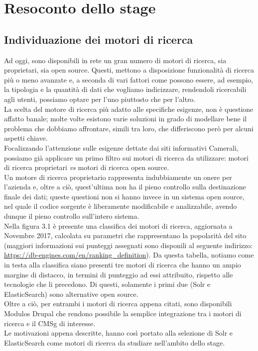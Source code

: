 

\chapter{Resoconto dello stage}
\label{cap:resoconto_dello_stage}

	\section{Individuazione dei motori di ricerca}
	Ad oggi, sono disponibili in rete un gran numero di motori di ricerca, sia proprietari, sia \gls{open source}. Questi, mettono a disposizione funzionalità di ricerca più o meno avanzate e, a seconda di vari fattori come possono essere, ad esempio, la tipologia e la quantità di dati che vogliamo indicizzare, rendendoli ricercabili agli utenti, possiamo optare per l'uno piuttosto che per l'altro. \\
	La scelta del motore di ricerca più adatto alle specifiche esigenze, non è questione affatto banale; molte volte esistono varie soluzioni in grado di modellare bene il problema che dobbiamo affrontare, simili tra loro, che differiscono però per alcuni aspetti chiave. \\
	Focalizzando l'attenzione sulle esigenze dettate dai siti informativi Camerali, possiamo già applicare un primo filtro sui motori di ricerca da utilizzare: motori di ricerca proprietari \textit{vs} motori di ricerca \gls{open source}. \\
	Un motore di ricerca proprietario rappresenta indubbiamente un onere per l'azienda e, oltre a ciò, quest'ultima non ha il pieno controllo sulla destinazione finale dei dati; queste questioni non si hanno invece in un sistema \gls{open source}, nel quale il codice sorgente è liberamente modificabile e analizzabile, avendo dunque il pieno controllo sull'intero sistema. \\
	Nella figura 3.1 è presente una classifica dei motori di ricerca, aggiornata a Novembre 2017, calcolata su parametri che rappresentano la popolarità del sito (maggiori informazioni sui punteggi assegnati sono disponili al seguente indirizzo: \url{https://db-engines.com/en/ranking_definition}). Da questa tabella, notiamo come in testa alla classifica siano presenti tre motori di ricerca che hanno un ampio margine di distacco, in termini di punteggio ad essi attribuito, rispetto alle tecnologie che li precedono. Di questi, solamente i primi due (\gls{Solr} e \gls{ElasticSearch}) sono alternative \gls{open source}. \\
	Oltre a ciò, per entrambi i motori di ricerca appena citati, sono disponibili \glspl{Modulo} \gls{Drupal} che rendono possibile la semplice integrazione tra i motori di ricerca e il \gls{CMSg} di interesse. \\
	Le motivazioni appena descritte, hanno così portato alla selezione di \gls{Solr} e \gls{ElasticSearch} come motori di ricerca da studiare nell'ambito dello stage.

